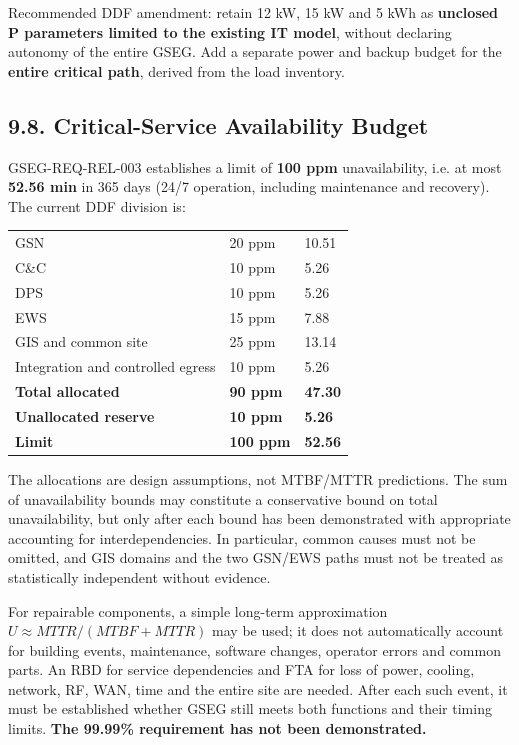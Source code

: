Recommended DDF amendment: retain 12 kW, 15 kW and 5 kWh as \textbf{unclosed P parameters limited to the existing IT model}, without declaring autonomy of the entire GSEG. Add a separate power and backup budget for the \textbf{entire critical path}, derived from the load inventory.

\subsection{9.8. Critical-Service Availability Budget}\label{ddjf-9-8}

GSEG-REQ-REL-003 establishes a limit of \textbf{100 ppm} unavailability, i.e. at most \textbf{52.56 min} in 365 days (24/\allowbreak{}7 operation, including maintenance and recovery). The current DDF division is:

\begingroup{}
\begin{longtable}{|P{0.48}|P{0.22}|P{0.30}|}
\hline{}
 &  & \\ \hline
\endhead
\hline\endlastfoot
GSN & 20 ppm & 10.51\\ \hline
C\&C & 10 ppm & 5.26\\ \hline
DPS & 10 ppm & 5.26\\ \hline
EWS & 15 ppm & 7.88\\ \hline
GIS and common site & 25 ppm & 13.14\\ \hline
Integration and controlled egress & 10 ppm & 5.26\\ \hline
\textbf{Total allocated} & \textbf{90 ppm} & \textbf{47.30}\\ \hline
\textbf{Unallocated reserve} & \textbf{10 ppm} & \textbf{5.26}\\ \hline
\textbf{Limit} & \textbf{100 ppm} & \textbf{52.56}\\*
\end{longtable}
\endgroup

The allocations are design assumptions, not MTBF/\allowbreak{}MTTR predictions. The sum of unavailability bounds may constitute a conservative bound on total unavailability, but only after each bound has been demonstrated with appropriate accounting for interdependencies. In particular, common causes must not be omitted, and GIS domains and the two GSN/\allowbreak{}EWS paths must not be treated as statistically independent without evidence.

For repairable components, a simple long-term approximation \(U\approx MTTR/(MTBF+MTTR)\) may be used; it does not automatically account for building events, maintenance, software changes, operator errors and common parts. An RBD for service dependencies and FTA for loss of power, cooling, network, RF, WAN, time and the entire site are needed. After each such event, it must be established whether GSEG still meets both functions and their timing limits. \textbf{The 99.99\% requirement has not been demonstrated.}

